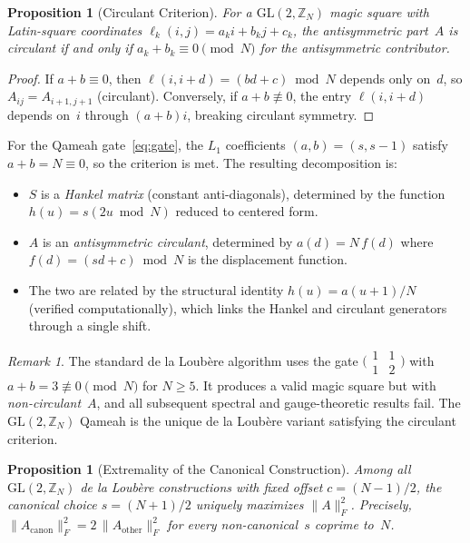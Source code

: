 \documentclass[aip,jmp,reprint,superscriptaddress,floatfix,nofootinbib]{revtex4-2}
\newtheorem{proposition}[theorem]{Proposition}
\theoremstyle{definition}
\theoremstyle{remark}
\newtheorem{remark}[theorem]{Remark}
\newcommand{\ZN}{\mathbb{Z}_N}
\newcommand{\GL}{\mathrm{GL}}
\begin{document}
\begin{proposition}[Circulant Criterion]\label{prop:circulant}
For a $\GL(2,\ZN)$ magic square with Latin-square coordinates
$\ell_k(i,j) = a_k i + b_k j + c_k$, the antisymmetric part~$A$ is
circulant if and only if $a_k + b_k \equiv 0 \pmod{N}$ for the
antisymmetric contributor.
\end{proposition}

\begin{proof}
If $a + b \equiv 0$, then
$\ell(i, i{+}d) = (bd + c) \bmod N$ depends only on~$d$, so
$A_{ij} = A_{i+1,j+1}$ (circulant).  Conversely, if $a + b
\not\equiv 0$, the entry $\ell(i, i{+}d)$ depends on~$i$ through
$(a{+}b)i$, breaking circulant symmetry.
\end{proof}

For the Qameah gate~\eqref{eq:gate}, the $L_1$ coefficients
$(a,b) = (s, s{-}1)$ satisfy $a + b = N \equiv 0$, so the criterion
is met.  The resulting decomposition is:
\begin{itemize}
\item $S$ is a \emph{Hankel matrix} (constant anti-diagonals),
  determined by the function $h(u) = s(2u \bmod N)$ reduced to
  centered form.
\item $A$ is an \emph{antisymmetric circulant}, determined by
  $a(d) = N\,f(d)$ where $f(d) = (sd + c) \bmod N$ is the
  displacement function.
\item The two are related by the structural identity
  $h(u) = a(u{+}1)/N$ (verified computationally), which links the Hankel and
  circulant generators through a single shift.
\end{itemize}

\begin{remark}
The standard de la Loub\`{e}re algorithm uses the gate
$\bigl(\begin{smallmatrix}1&1\\1&2\end{smallmatrix}\bigr)$ with
$a + b = 3 \not\equiv 0 \pmod{N}$ for $N \ge 5$.  It produces a
valid magic square but with \emph{non-circulant}~$A$, and all
subsequent spectral and gauge-theoretic results fail.  The
$\GL(2,\ZN)$ Qameah is the unique de la Loub\`{e}re variant satisfying the
circulant criterion.
\end{remark}

\begin{proposition}[Extremality of the Canonical Construction]
\label{prop:extremality}
Among all $\GL(2,\ZN)$ de la Loub\`{e}re constructions with fixed offset
$c = (N-1)/2$, the canonical choice $s = (N+1)/2$ uniquely maximizes
$\|A\|_F^2$.  Precisely,
$\|A_{\mathrm{canon}}\|_F^2 = 2\,\|A_{\mathrm{other}}\|_F^2$
for every non-canonical~$s$ coprime to~$N$.
\end{proposition}
\end{document}
